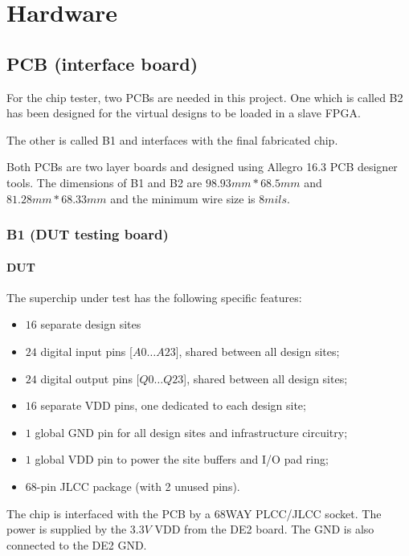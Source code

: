 \chapter{Hardware}


\section{PCB (interface board)}
For the chip tester, two PCBs are needed in this project. One which is called B2
has been designed for the virtual designs to be loaded in a slave FPGA.

The other is called B1 and interfaces with the final fabricated chip.

Both PCBs are two layer boards and designed using Allegro 16.3 PCB designer tools.
The dimensions of B1 and B2 are $98.93 mm* 68.5 mm$ and $81.28 mm * 68.33 mm$ and the minimum wire size is $8mils$.

\newpage
\subsection{B1 (DUT testing board)}

\subsubsection{DUT}

The superchip under test has the following specific features:
\begin{itemize}
 \item $16$ separate design sites
 \item $24$ digital input pins [$A0\dots A23$], shared between all design sites;
 \item $24$ digital output pins [$Q0\dots Q23$], shared between all design sites;
 \item $16$ separate VDD pins, one dedicated to each design site;
 \item $1$ global GND pin for all design sites and infrastructure circuitry;
 \item $1$ global VDD pin to power the site buffers and I/O pad ring;
 \item $68$-pin JLCC package (with 2 unused pins).
\end{itemize}

The chip is interfaced with the PCB by a 68WAY PLCC/JLCC socket. The power is
supplied by the $3.3V$ VDD from the DE2 board. The GND is also connected to the DE2 GND.


